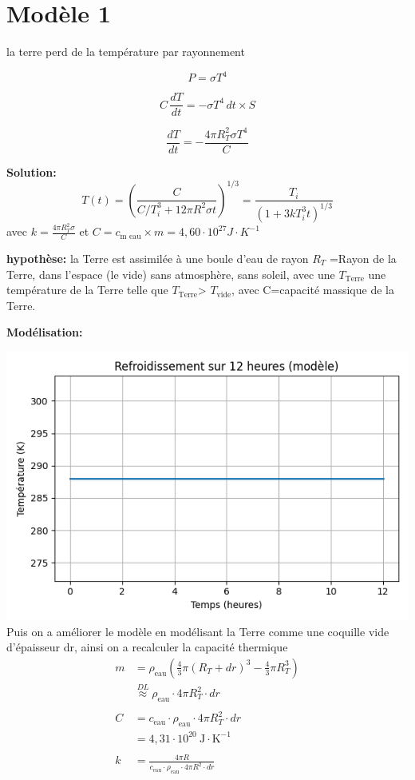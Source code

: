 \documentclass[a4paper,12pt]{article}
\begin{document}
\section{Modèle 1}

la terre perd de la température par rayonnement 

\[   P= \sigma T^4 
\]

\[    C \, \frac{dT}{dt} = - \sigma T^4 \, dt \times S
\]

\[\frac{dT}{dt} = - \frac{4 \pi R_T^2 \sigma T^4}{C}\]  

\textbf{Solution:} 
\[
T(t) = \left( \frac{C}{C/T_i^3 + 12\pi R^2 \sigma t} \right)^{1/3} 
= \frac{T_i}{\left(1 + 3k T_i^3 t \right)^{1/3}}
\]
avec \(k=\frac{4\pi R_T^2 \sigma}{C}\)
et \(C=c_{\text{m eau}}\times m=4,60 \cdot 10^{27} J\cdot K^{-1}\)

\bigskip

\textbf{hypothèse:} la Terre est assimilée à une boule d'eau de rayon \(R_{T}\) =Rayon de la Terre,  dans l'espace (le vide) sans atmosphère, sans soleil, avec une \(T_{\text{Terre}}\) une température de la Terre telle que  \(T_{\text{Terre}}\)> \(T_{\text{vide}}\), avec C=capacité massique de la Terre. 

\bigskip
\textbf{Modélisation:} 
    
    \includegraphics[width=0.8\linewidth]{../figures/modele1.png}
\\
Puis on a améliorer le modèle en modélisant la Terre comme une coquille vide d'épaisseur dr, ainsi on a recalculer la capacité thermique  \\

\begin{align*}
m &= \rho_{\text{eau}} \left( \frac{4}{3} \pi (R_T + dr)^3 - \frac{4}{3} \pi R_T^3 \right) \\
&\overset{DL}{\approx} \rho_{\text{eau}} \cdot 4\pi R_T^2 \cdot dr \\
\\
C &= c_{\text{eau}} \cdot \rho_{\text{eau}} \cdot 4\pi R_T^2 \cdot dr \\
&= 4{,}31 \cdot 10^{20} \ \text{J} \cdot \text{K}^{-1} \\
\\
k &= \frac{4\pi R}{c_{\text{eau}} \cdot \rho_{\text{eau}} \cdot 4\pi R^2 \cdot dr}
\end{align*}
\end{document}
